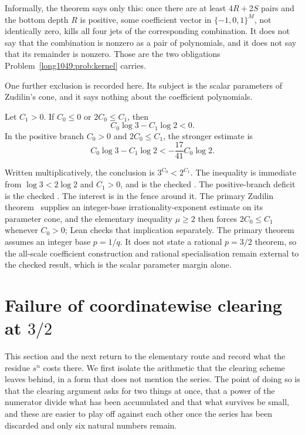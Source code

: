 \documentclass[11pt]{article}
\begin{document}
Informally, the theorem says only this: once there are at least \(4R+2S\) pairs
and the bottom depth \(R\) is positive, some coefficient vector in
\(\{-1,0,1\}^M\), not identically zero, kills all four jets of the
corresponding combination.  It does not say that the combination is nonzero as
a pair of polynomials, and it does not say that its remainder is nonzero.  Those
are the two obligations Problem~\ref{long1049:prob:kernel} carries.

One further exclusion is recorded here.  Its subject is the scalar parameters
of Zudilin's cone, and it says nothing about the coefficient polynomials.

\begin{theorem}\label{long1049:res:scalar}
Let \(C_1>0\).  If \(C_0\le0\) or \(2C_0\le C_1\), then
\[
 C_0\log 3-C_1\log 2<0.
\]
In the positive branch $C_0>0$ and $2C_0\le C_1$, the stronger estimate is
\[
 C_0\log3-C_1\log2< -\frac{17}{41}C_0\log2.
\]
\end{theorem}

\noindent Written multiplicatively, the conclusion is \(3^{C_0}<2^{C_1}\).  The
inequality is immediate from \(\log3<2\log2\) and \(C_1>0\), and
is the checked
.  The positive-branch deficit is the checked
.
The interest is in the fence around it.  The primary Zudilin
theorem~\cite[Theorem~1, p.~154; Sec.~5, pp.~161--162]{zudilin2004} supplies an integer-base
irrationality-exponent estimate on its parameter cone, and the elementary
inequality \(\mu\ge2\) then forces \(2C_0\le C_1\) whenever \(C_0>0\); Lean
checks that implication separately.  The primary theorem assumes an integer
base \(p=1/q\).  It does not state a rational \(p=3/2\) theorem, so the
all-scale coefficient construction and rational specialisation remain
external to the checked result, which is the scalar parameter margin alone.

\section{Failure of coordinatewise clearing at $3/2$}\label{long1049:sec:corridor}

This section and the next return to the elementary route and record what the
residue $s^{n}$ costs there.  We first isolate the arithmetic that the clearing
scheme leaves behind, in a form that does not mention the series.  The point of
doing so is that the clearing argument asks for two things at once, that a
power of the numerator divide what has been accumulated and that what survives
be small, and these are easier to play off against each other once the series
has been discarded and only six natural numbers remain.
\end{document}
